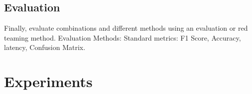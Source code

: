 \documentclass{article}
\begin{document}
\subsection{Evaluation}
Finally, evaluate combinations and different methods using an evaluation or red teaming method. 
Evaluation Methods: 
Standard metrics: F1 Score, Accuracy, latency, Confusion Matrix. 


\section{Experiments}



\end{document}
